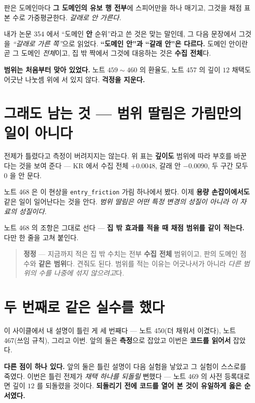 \documentclass[11pt]{article}
\begin{document}
판은 도메인마다 \textbf{그 도메인의 유보 행 전부}에 스피어만을 하나
매기고, 그것을 채점 표본 수로 가중평균한다. \emph{갈래로 안 가른다.}

내가 논문 354 에서 ``도메인 \textbf{안} 순위''라고 쓴 것은 맞는 말인데,
그 다음 문장에서 그것을 \emph{``갈래로 가른 쪽''}으로 읽었다.
\textbf{``도메인 안''과 ``갈래 안''은 다르다.} 도메인 안이란 곧 그 도메인
\emph{전체}이고, 집 밖 짝에서 그것에 대응하는 것은 \textbf{수집 전체}다.

\textbf{범위는 처음부터 맞아 있었다.} 노트 $459 \sim 460$ 의 환율도,
노트 457 의 깊이 $12$ 채택도 어긋난 나눗셈 위에 서 있지 않다.
\textbf{걱정을 지운다.}

\section{그래도 남는 것 --- 범위 딸림은 가림만의 일이 아니다}

전제가 틀렸다고 측정이 버려지지는 않는다. 위 표는 \textbf{깊이도} 범위에
따라 부호를 바꾼다는 것을 보여 준다 --- KR 에서 수집 전체 $+0.0048$,
갈래 안 $-0.0090$, 두 구간 모두 $0$ 을 안 문다.

노트 468 은 이 현상을 \texttt{entry\_friction} 가림 하나에서 봤다. 이제
\textbf{용량 손잡이에서도} 같은 일이 일어난다는 것을 안다. \emph{범위
딸림은 어떤 특정 변경의 성질이 아니라 이 자료의 성질이다.}

노트 468 의 조항은 그대로 선다 --- \textbf{집 밖 효과를 적을 때 채점
범위를 같이 적는다.} 다만 한 줄을 고쳐 붙인다.

\begin{quote}
\textbf{정정} --- 지금까지 적은 집 밖 수치는 전부 \textbf{수집 전체}
범위이고, 판의 도메인 점수와 \textbf{같은 범위}다. 견줘도 된다. 범위를
적는 이유는 어긋나서가 아니라 \emph{다른 범위의 수를 나중에 섞지
않으려고}다.
\end{quote}

\section{두 번째로 같은 실수를 했다}

이 사이클에서 내 설명이 틀린 게 세 번째다 --- 노트 450(더 채워서 이겼다),
노트 467(쓰임 규칙), 그리고 이번. 앞의 둘은 \textbf{측정}으로 잡았고
이번은 \textbf{코드를 읽어서} 잡았다.

\textbf{다른 점이 하나 있다.} 앞의 둘은 틀린 설명이 다음 실험을 낳았고
그 실험이 스스로를 죽였다. 이번은 틀린 전제가 \emph{채택 하나를 되돌릴}
뻔했다 --- 노트 469 의 사전 등록대로면 깊이 $12$ 를 되돌렸을 것이다.
\textbf{되돌리기 전에 코드를 열어 본 것이 유일하게 옳은 순서였다.}
\end{document}
